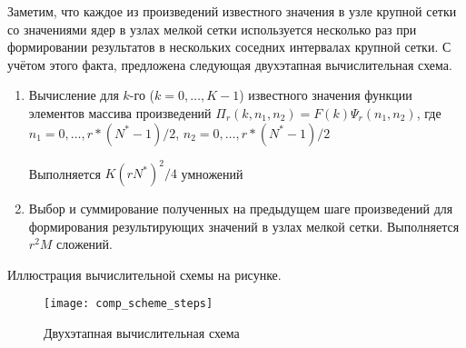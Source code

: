 Заметим, 
что каждое из произведений известного значения в узле крупной сетки
со значениями ядер в узлах мелкой сетки используется несколько раз
при формировании результатов в нескольких соседних
интервалах крупной сетки. 
С учётом этого факта,
предложена следующая двухэтапная вычислительная схема.
\begin{enumerate}
\item
  Вычисление для $k$-го ($k = 0, \ldots, K-1$)
  известного значения функции 
  элементов массива произведений
  $\Pi_r(k,n_1, n_2) = F(k)\Psi_r(n_1, n_2)$,
  где $n_1=0, \ldots, r*(N^*-1)/2$,
      $n_2=0, \ldots, r*(N^*-1)/2$

  Выполняется $K(rN^*)^2 / 4$ умножений
  

\item
  Выбор и суммирование полученных на предыдущем шаге произведений
  для формирования результирующих значений в узлах мелкой сетки.
  Выполняется $r^2M$ сложений.
\end{enumerate}




Иллюстрация вычислительной схемы на рисунке.
\begin{figure}[h!]
  \centering
  \texttt{[image: comp\_scheme\_steps]} 
  \caption{Двухэтапная вычислительная схема}
  \label{fig:reg_net}
\end{figure}
\FloatBarrier


